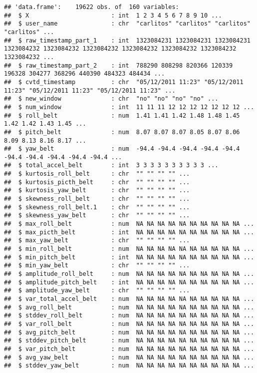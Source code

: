 \documentclass[
]{article}
\begin{document}
\begin{verbatim}
## 'data.frame':    19622 obs. of  160 variables:
##  $ X                       : int  1 2 3 4 5 6 7 8 9 10 ...
##  $ user_name               : chr  "carlitos" "carlitos" "carlitos" "carlitos" ...
##  $ raw_timestamp_part_1    : int  1323084231 1323084231 1323084231 1323084232 1323084232 1323084232 1323084232 1323084232 1323084232 1323084232 ...
##  $ raw_timestamp_part_2    : int  788290 808298 820366 120339 196328 304277 368296 440390 484323 484434 ...
##  $ cvtd_timestamp          : chr  "05/12/2011 11:23" "05/12/2011 11:23" "05/12/2011 11:23" "05/12/2011 11:23" ...
##  $ new_window              : chr  "no" "no" "no" "no" ...
##  $ num_window              : int  11 11 11 12 12 12 12 12 12 12 ...
##  $ roll_belt               : num  1.41 1.41 1.42 1.48 1.48 1.45 1.42 1.42 1.43 1.45 ...
##  $ pitch_belt              : num  8.07 8.07 8.07 8.05 8.07 8.06 8.09 8.13 8.16 8.17 ...
##  $ yaw_belt                : num  -94.4 -94.4 -94.4 -94.4 -94.4 -94.4 -94.4 -94.4 -94.4 -94.4 ...
##  $ total_accel_belt        : int  3 3 3 3 3 3 3 3 3 3 ...
##  $ kurtosis_roll_belt      : chr  "" "" "" "" ...
##  $ kurtosis_picth_belt     : chr  "" "" "" "" ...
##  $ kurtosis_yaw_belt       : chr  "" "" "" "" ...
##  $ skewness_roll_belt      : chr  "" "" "" "" ...
##  $ skewness_roll_belt.1    : chr  "" "" "" "" ...
##  $ skewness_yaw_belt       : chr  "" "" "" "" ...
##  $ max_roll_belt           : num  NA NA NA NA NA NA NA NA NA NA ...
##  $ max_picth_belt          : int  NA NA NA NA NA NA NA NA NA NA ...
##  $ max_yaw_belt            : chr  "" "" "" "" ...
##  $ min_roll_belt           : num  NA NA NA NA NA NA NA NA NA NA ...
##  $ min_pitch_belt          : int  NA NA NA NA NA NA NA NA NA NA ...
##  $ min_yaw_belt            : chr  "" "" "" "" ...
##  $ amplitude_roll_belt     : num  NA NA NA NA NA NA NA NA NA NA ...
##  $ amplitude_pitch_belt    : int  NA NA NA NA NA NA NA NA NA NA ...
##  $ amplitude_yaw_belt      : chr  "" "" "" "" ...
##  $ var_total_accel_belt    : num  NA NA NA NA NA NA NA NA NA NA ...
##  $ avg_roll_belt           : num  NA NA NA NA NA NA NA NA NA NA ...
##  $ stddev_roll_belt        : num  NA NA NA NA NA NA NA NA NA NA ...
##  $ var_roll_belt           : num  NA NA NA NA NA NA NA NA NA NA ...
##  $ avg_pitch_belt          : num  NA NA NA NA NA NA NA NA NA NA ...
##  $ stddev_pitch_belt       : num  NA NA NA NA NA NA NA NA NA NA ...
##  $ var_pitch_belt          : num  NA NA NA NA NA NA NA NA NA NA ...
##  $ avg_yaw_belt            : num  NA NA NA NA NA NA NA NA NA NA ...
##  $ stddev_yaw_belt         : num  NA NA NA NA NA NA NA NA NA NA ...

\end{verbatim}
\end{document}

